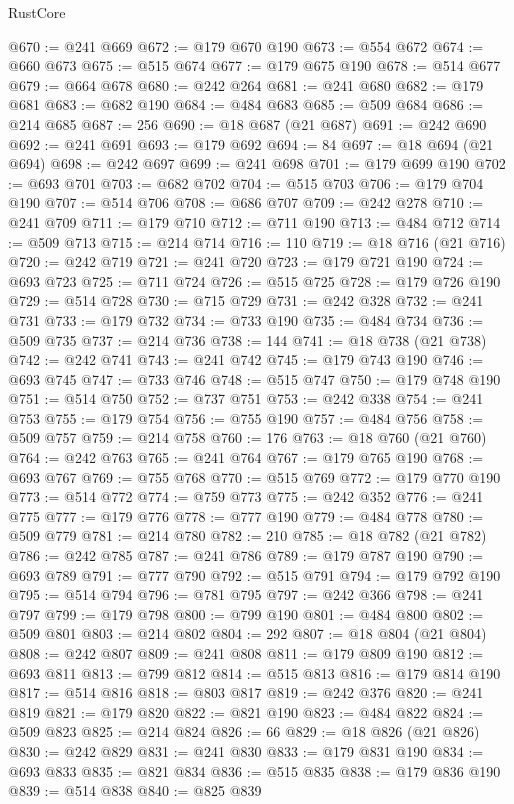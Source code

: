 \begin{lexlean}{RustCore}
\begin{coremodule}
@670 := @241 @669
@672 := @179 @670 @190
@673 := @554 @672
@674 := @660 @673
@675 := @515 @674
@677 := @179 @675 @190
@678 := @514 @677
@679 := @664 @678
@680 := @242 @264
@681 := @241 @680
@682 := @179 @681
@683 := @682 @190
@684 := @484 @683
@685 := @509 @684
@686 := @214 @685
@687 := 256
@690 := @18 @687 (@21 @687)
@691 := @242 @690
@692 := @241 @691
@693 := @179 @692
@694 := 84
@697 := @18 @694 (@21 @694)
@698 := @242 @697
@699 := @241 @698
@701 := @179 @699 @190
@702 := @693 @701
@703 := @682 @702
@704 := @515 @703
@706 := @179 @704 @190
@707 := @514 @706
@708 := @686 @707
@709 := @242 @278
@710 := @241 @709
@711 := @179 @710
@712 := @711 @190
@713 := @484 @712
@714 := @509 @713
@715 := @214 @714
@716 := 110
@719 := @18 @716 (@21 @716)
@720 := @242 @719
@721 := @241 @720
@723 := @179 @721 @190
@724 := @693 @723
@725 := @711 @724
@726 := @515 @725
@728 := @179 @726 @190
@729 := @514 @728
@730 := @715 @729
@731 := @242 @328
@732 := @241 @731
@733 := @179 @732
@734 := @733 @190
@735 := @484 @734
@736 := @509 @735
@737 := @214 @736
@738 := 144
@741 := @18 @738 (@21 @738)
@742 := @242 @741
@743 := @241 @742
@745 := @179 @743 @190
@746 := @693 @745
@747 := @733 @746
@748 := @515 @747
@750 := @179 @748 @190
@751 := @514 @750
@752 := @737 @751
@753 := @242 @338
@754 := @241 @753
@755 := @179 @754
@756 := @755 @190
@757 := @484 @756
@758 := @509 @757
@759 := @214 @758
@760 := 176
@763 := @18 @760 (@21 @760)
@764 := @242 @763
@765 := @241 @764
@767 := @179 @765 @190
@768 := @693 @767
@769 := @755 @768
@770 := @515 @769
@772 := @179 @770 @190
@773 := @514 @772
@774 := @759 @773
@775 := @242 @352
@776 := @241 @775
@777 := @179 @776
@778 := @777 @190
@779 := @484 @778
@780 := @509 @779
@781 := @214 @780
@782 := 210
@785 := @18 @782 (@21 @782)
@786 := @242 @785
@787 := @241 @786
@789 := @179 @787 @190
@790 := @693 @789
@791 := @777 @790
@792 := @515 @791
@794 := @179 @792 @190
@795 := @514 @794
@796 := @781 @795
@797 := @242 @366
@798 := @241 @797
@799 := @179 @798
@800 := @799 @190
@801 := @484 @800
@802 := @509 @801
@803 := @214 @802
@804 := 292
@807 := @18 @804 (@21 @804)
@808 := @242 @807
@809 := @241 @808
@811 := @179 @809 @190
@812 := @693 @811
@813 := @799 @812
@814 := @515 @813
@816 := @179 @814 @190
@817 := @514 @816
@818 := @803 @817
@819 := @242 @376
@820 := @241 @819
@821 := @179 @820
@822 := @821 @190
@823 := @484 @822
@824 := @509 @823
@825 := @214 @824
@826 := 66
@829 := @18 @826 (@21 @826)
@830 := @242 @829
@831 := @241 @830
@833 := @179 @831 @190
@834 := @693 @833
@835 := @821 @834
@836 := @515 @835
@838 := @179 @836 @190
@839 := @514 @838
@840 := @825 @839

\end{coremodule}
\end{lexlean}
